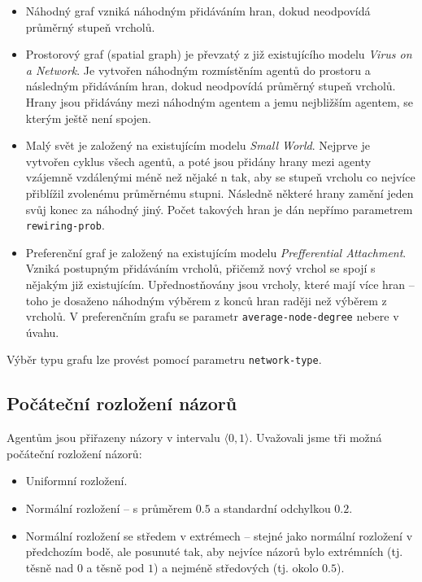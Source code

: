 \documentclass[10pt,a4paper]{report}
\begin{document}
\begin{itemize}
	\item Náhodný graf vzniká náhodným přidáváním hran, dokud neodpovídá průměrný stupeň vrcholů.
	\item Prostorový graf (spatial graph) je převzatý z již existujícího modelu \textit{Virus on a Network}. Je vytvořen náhodným rozmístěním agentů do prostoru a následným přidáváním hran, dokud neodpovídá průměrný stupeň vrcholů. Hrany jsou přidávány mezi náhodným agentem a jemu nejbližším agentem, se kterým ještě není spojen.
	\item Malý svět je založený na existujícím modelu \textit{Small World}. Nejprve je vytvořen cyklus všech agentů, a poté jsou přidány hrany mezi agenty vzájemně vzdálenými méně než nějaké n tak, aby se stupeň vrcholu co nejvíce přiblížil zvolenému průměrnému stupni. Následně některé hrany zamění jeden svůj konec za náhodný jiný. Počet takových hran je dán nepřímo parametrem \texttt{rewiring-prob}.
	\item Preferenční graf je založený na existujícím modelu \textit{Prefferential Attachment}. Vzniká postupným přidáváním vrcholů, přičemž nový vrchol se spojí s nějakým již existujícím. Upřednostňovány jsou vrcholy, které mají více hran -- toho je dosaženo náhodným výběrem z konců hran raději než výběrem z vrcholů. V preferenčním grafu se parametr \texttt{average-node-degree} nebere v úvahu.
\end{itemize}

Výběr typu grafu lze provést pomocí parametru \texttt{network-type}.

\subsection{Počáteční rozložení názorů}
Agentům jsou přiřazeny názory v intervalu $\langle 0, 1 \rangle$. Uvažovali jsme tři možná počáteční rozložení názorů:

\begin{itemize}
	\item Uniformní rozložení.
	\item Normální rozložení -- s průměrem $0.5$ a standardní odchylkou $0.2$.
	\item Normální rozložení se středem v extrémech -- stejné jako normální rozložení v předchozím bodě, ale posunuté tak, aby nejvíce názorů bylo extrémních (tj. těsně nad $0$ a těsně pod $1$) a nejméně středových (tj. okolo $0.5$).
\end{itemize}
\end{document}

